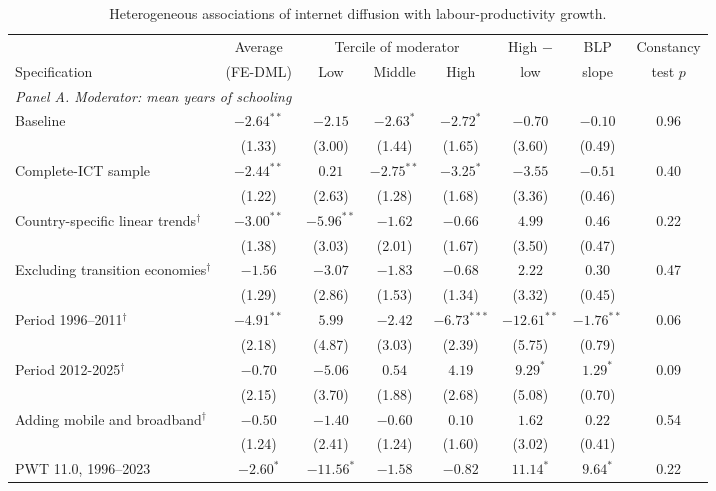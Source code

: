 \documentclass[preprint,12pt,authoryear]{elsarticle}
\begin{document}
\begin{table}[!p]
\centering
\begin{threeparttable}
\caption{Heterogeneous associations of internet diffusion with labour-productivity growth.}\label{tab:emp}
\scriptsize
\setlength{\tabcolsep}{2.5pt}
\begin{tabular}{lccccccc}
\toprule
 & Average & \multicolumn{3}{c}{Tercile of moderator} & High $-$ & BLP & Constancy\\
\cmidrule(lr){3-5}
Specification & (FE-DML) & Low & Middle & High & low & slope & test $p$\\
\midrule
\multicolumn{8}{l}{\textit{Panel A. Moderator: mean years of schooling}}\\
\quad Baseline & $-2.64^{**}$ & $-2.15$ & $-2.63^{*}$ & $-2.72^{*}$ & $-0.70$ & $-0.10$ & 0.96\\
 & (1.33) & (3.00) & (1.44) & (1.65) & (3.60) & (0.49) & \\
\quad Complete-ICT sample & $-2.44^{**}$ & $0.21$ & $-2.75^{**}$ & $-3.25^{*}$ & $-3.55$ & $-0.51$ & 0.40\\
 & (1.22) & (2.63) & (1.28) & (1.68) & (3.36) & (0.46) & \\
\quad Country-specific linear trends$^{\dagger}$ & $-3.00^{**}$ & $-5.96^{**}$ & $-1.62$ & $-0.66$ & $4.99$ & $0.46$ & 0.22\\
 & (1.38) & (3.03) & (2.01) & (1.67) & (3.50) & (0.47) & \\
\quad Excluding transition economies$^{\dagger}$ & $-1.56$ & $-3.07$ & $-1.83$ & $-0.68$ & $2.22$ & $0.30$ & 0.47\\
 & (1.29) & (2.86) & (1.53) & (1.34) & (3.32) & (0.45) & \\
\quad Period 1996--2011$^{\dagger}$ & $-4.91^{**}$ & $5.99$ & $-2.42$ & $-6.73^{***}$ & $-12.61^{**}$ & $-1.76^{**}$ & 0.06\\
 & (2.18) & (4.87) & (3.03) & (2.39) & (5.75) & (0.79) & \\
\quad Period 2012-2025$^{\dagger}$ & $-0.70$ & $-5.06$ & $0.54$ & $4.19$ & $9.29^{*}$ & $1.29^{*}$ & 0.09\\
 & (2.15) & (3.70) & (1.88) & (2.68) & (5.08) & (0.70) & \\
\quad Adding mobile and broadband$^{\dagger}$ & $-0.50$ & $-1.40$ & $-0.60$ & $0.10$ & $1.62$ & $0.22$ & 0.54\\
 & (1.24) & (2.41) & (1.24) & (1.60) & (3.02) & (0.41) & \\
\quad PWT 11.0, 1996--2023 & $-2.60^{*}$ & $-11.56^{*}$ & $-1.58$ & $-0.82$ & $11.14^{*}$ & $9.64^{*}$ & 0.22\\

\end{tabular}
\end{threeparttable}
\end{table}
\end{document}
